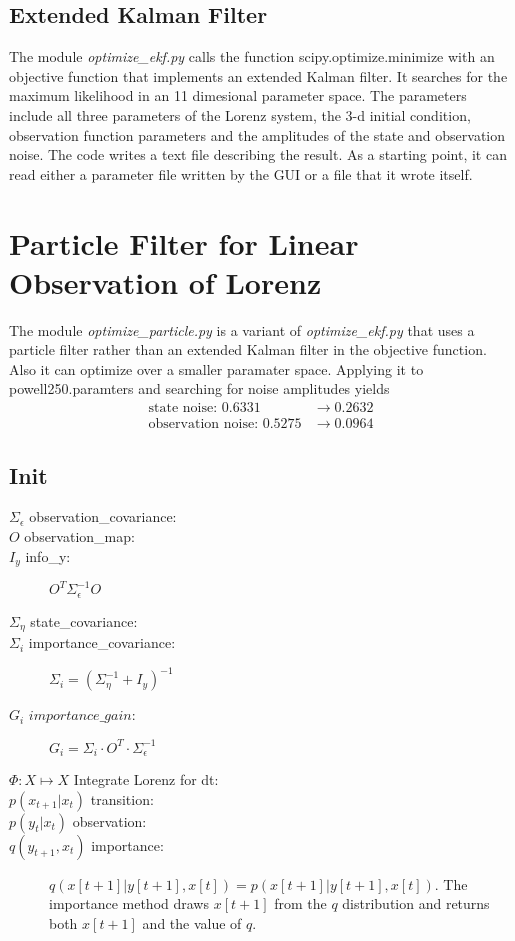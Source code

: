 \documentclass[12pt]{article}
\begin{document}
\subsection{Extended Kalman Filter}
\label{sec:ekf}

The module \emph{optimize\_ekf.py} calls the function
scipy.optimize.minimize with an objective function that implements an
extended Kalman filter.  It searches for the maximum likelihood in an
11 dimesional parameter space.  The parameters include all three
parameters of the Lorenz system, the 3-d initial condition,
observation function parameters and the amplitudes of the state and
observation noise.  The code writes a text file describing the result.
As a starting point, it can read either a parameter file written by
the GUI or a file that it wrote itself.

\section{Particle Filter for Linear Observation of Lorenz}
\label{sec:linear_observation}

The module \emph{optimize\_particle.py} is a variant of
\emph{optimize\_ekf.py} that uses a particle filter rather than an
extended Kalman filter in the objective function.  Also it can
optimize over a smaller paramater space.  Applying it to
powell250.paramters and searching for noise amplitudes yields
\begin{align*}
  \text{state noise: }       0.6331 &\rightarrow 0.2632 \\
  \text{observation noise: } 0.5275 &\rightarrow 0.0964
\end{align*}

\subsection{Init}
\label{sec:init}

\begin{description}
\item[$\Sigma_\epsilon$ observation\_covariance:] 
\item[$O$ observation\_map:] 
\item[$I_y$ info\_y:] $O^T \Sigma_\epsilon^{-1} O$
\item[$\Sigma_\eta$ state\_covariance:] 
\item[$\Sigma_i$ importance\_covariance:] $\Sigma_i = \left(
    \Sigma_\eta^{-1} + I_y \right)^{-1}$
\item[$G_i$ $importance\_gain$:] $G_i = \Sigma_i \cdot O^T \cdot
  \Sigma_\epsilon^{-1} $
\item[$\Phi: X \mapsto X$ Integrate Lorenz for dt:] 
\item[$p(x_{t+1}|x_t)$ transition:] 
\item[$p(y_t|x_t)$ observation:] 
\item[$q(y_{t+1},x_t)$ importance:] $q(x[t+1]|y[t+1], x[t]) =
  p(x[t+1]|y[t+1], x[t])$.  The importance method draws $x[t+1]$
  from the $q$ distribution and returns both $x[t+1]$ and the value
  of $q$.
\end{description}
\end{document}

